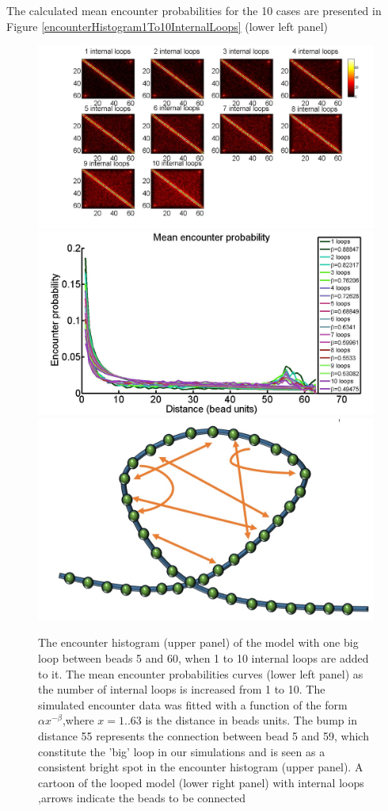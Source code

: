 \documentclass[12pt]{paper}
\begin{document}
The calculated mean encounter probabilities  for the 10 cases are presented in Figure \ref{encounterHistogram1To10InternalLoops} (lower left panel)
\begin{figure}[H]
\centering
\includegraphics[scale=0.3]{encounterHistogram1To10InternalLoops}
\includegraphics[scale=0.15]{meanEncounterProbabilityInternalLoops}
\includegraphics[scale=0.2]{polymerModelWithLoopAndInternalConnectors}
\caption{\scriptsize{The encounter histogram (upper panel) of the model with one big loop between beads 5 and 60, when 1 to 10 internal loops are added to it. The mean encounter probabilities curves (lower left panel) as the number of internal loops is increased from 1 to 10. The simulated encounter data was fitted with a function of the form $\alpha x^{-\beta}$,where $x=1..63$ is the distance in beads units. The bump in distance 55 represents the connection between bead 5 and 59, which constitute the 'big' loop in our simulations and is seen as a consistent bright spot in the encounter histogram (upper panel). A cartoon of the looped model (lower right panel) with internal loops ,arrows indicate the beads to be connected}}

\end{figure}
\end{document}
